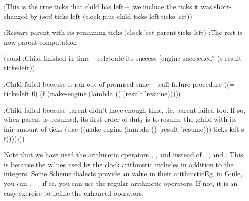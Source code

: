 {        ;This is the true ticks that child has left --
        ;we include the ticks it was short-changed by
        (set! ticks-left 
          (clock-plus child-ticks-left ticks-left))

        ;Restart parent with its remaining ticks
        (clock 'set parent-ticks-left)
        ;The rest is now parent computation

        (cond
         ;Child finished in time -- celebrate its success
         (engine-succeeded? (s result ticks-left))

         ;Child failed because it ran out of promised time --
         ;call failure procedure
         ((= ticks-left 0)
          (f (make-engine (lambda () (result 'resume)))))

         ;Child failed because parent didn't have enough time,
         ;ie, parent failed too.  If so, when parent is
         ;resumed, its first order of duty is to resume the
         ;child with its fair amount of ticks
         (else
          ((make-engine (lambda () (result 'resume)))
           ticks-left s f)))))))
}

Note that we have used the arithmetic operators
, , and 
instead of , \q{-}, and \q{+}.  This is because
the values used by the clock arithmetic includes
 in addition to the integers.  Some Scheme
dialects provide an  value in their
arithmetic\f{Eg, in Guile, you can .} --- if so, you can use the regular
arithmetic operators.  If not, it is an easy exercise
to define the enhanced operators.





